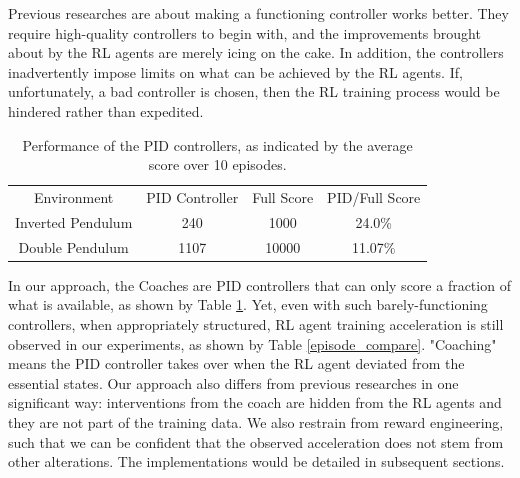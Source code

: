 \documentclass{IJCAS}
\begin{document}
Previous researches\cite{Xie2018LearningWT}\cite{Carlucho2017IncrementalQS}\cite{Pavse2020RIDMRI} are about making a functioning controller works better. They require high-quality controllers to begin with, and the improvements brought about by the RL agents are merely icing on the cake. In addition, the controllers inadvertently impose limits on what can be achieved by the RL agents. If, unfortunately, a bad controller is chosen, then the RL training process would be hindered rather than expedited. 


\begin{table}[H]
\footnotesize
\caption{Performance of the PID controllers, as indicated by the average score over 10 episodes.}
\label{score_compare}
\centering
\begin{tabular}{ cccc }
\rowcolor{airforceblue}
Environment & PID Controller &Full Score &PID\slash Full Score \\
Inverted Pendulum & 240 & 1000& 24.0\%\\
\rowcolor{beaublue}

Double Pendulum & 1107 & 10000& 11.07\%\\
\end{tabular}
\end{table}

In our approach, the Coaches are PID controllers that can only score a fraction of what is available, as shown by Table \ref{score_compare}. Yet, even with such barely-functioning controllers, when appropriately structured, RL agent training acceleration is still observed in our experiments, as shown by Table \ref{episode_compare}. "Coaching" means the PID controller takes over when the RL agent deviated from the essential states. Our approach also differs from previous researches in one significant way: interventions from the coach are hidden from the RL agents and they are not part of the training data. We also restrain from reward engineering, such that we can be confident that the observed acceleration does not stem from other alterations. The implementations would be detailed in subsequent sections.
\end{document}
